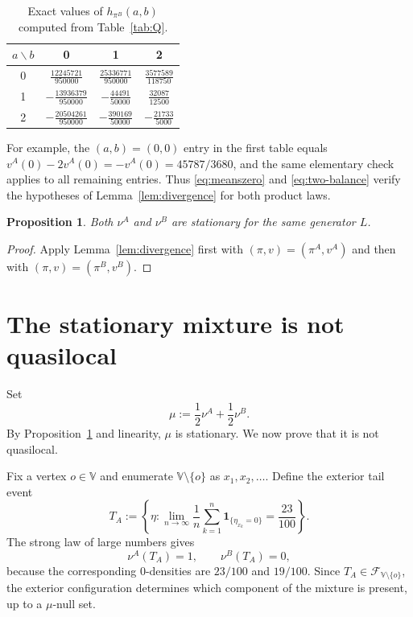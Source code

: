 \documentclass[11pt]{article}
\newtheorem{proposition}[theorem]{Proposition}
\newcommand{\V}{\mathbb V}
\newcommand{\F}{\mathcal F}
\newcommand{\nuA}{\nu^{A}}
\newcommand{\nuB}{\nu^{B}}
\begin{document}
\begin{table}[ht]
\centering
\caption{Exact values of $h_{\pi^B}(a,b)$ computed from Table~\ref{tab:Q}.}
\label{tab:hB}
\begin{tabular}{c|ccc}
\toprule
$a\backslash b$&0&1&2\\
\midrule
0&$\frac{12245721}{950000}$&$\frac{25336771}{950000}$&$\frac{3577589}{118750}$\\
1&$-\frac{13936379}{950000}$&$-\frac{44491}{50000}$&$\frac{32087}{12500}$\\
2&$-\frac{20504261}{950000}$&$-\frac{390169}{50000}$&$-\frac{21733}{5000}$\\
\bottomrule
\end{tabular}
\end{table}

For example, the $(a,b)=(0,0)$ entry in the first table equals
$v^A(0)-2v^A(0)=-v^A(0)=45787/3680$, and the same elementary check applies to
all remaining entries.  Thus \eqref{eq:meanszero} and
\eqref{eq:two-balance} verify the hypotheses of Lemma~\ref{lem:divergence}
for both product laws.

\begin{proposition}\label{prop:twostationary}
Both $\nuA$ and $\nuB$ are stationary for the same generator $L$.
\end{proposition}

\begin{proof}
Apply Lemma~\ref{lem:divergence} first with $(\pi,v)=(\pi^A,v^A)$ and then
with $(\pi,v)=(\pi^B,v^B)$.
\end{proof}

\section{The stationary mixture is not quasilocal}

Set
\begin{equation}
  \mu:=\frac12\nuA+\frac12\nuB.
  \label{eq:mixture}
\end{equation}
By Proposition~\ref{prop:twostationary} and linearity, $\mu$ is stationary.
We now prove that it is not quasilocal.

Fix a vertex $o\in\V$ and enumerate $\V\setminus\{o\}$ as
$x_1,x_2,\dots$.  Define the exterior tail event
\begin{equation}
 T_A:=\left\{\eta:
 \lim_{n\to\infty}\frac1n\sum_{k=1}^n
 \mathbf 1_{\{\eta_{x_k}=0\}}=\frac{23}{100}
 \right\}.
 \label{eq:TA}
\end{equation}
The strong law of large numbers gives
\begin{equation}
 \nuA(T_A)=1,
 \qquad
 \nuB(T_A)=0,
 \label{eq:tailseparates}
\end{equation}
because the corresponding $0$-densities are $23/100$ and $19/100$.
Since $T_A\in\F_{\V\setminus\{o\}}$, the exterior configuration determines
which component of the mixture is present, up to a $\mu$-null set.
\end{document}
